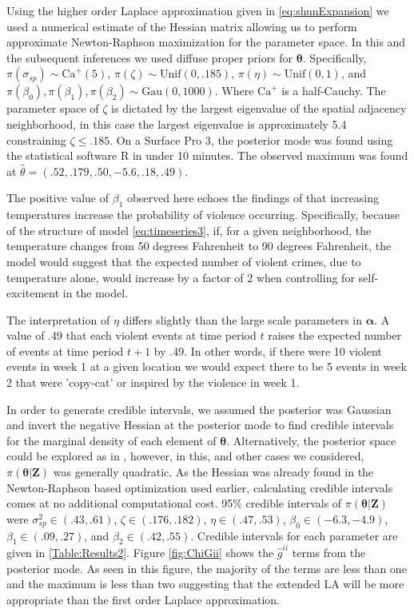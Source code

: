 \documentclass[11pt]{isuthesis}
\begin{document}
	Using the higher order Laplace approximation given in \eqref{eq:shunExpansion} we used a numerical estimate of the Hessian matrix allowing us to perform approximate Newton-Raphson maximization for the parameter space.  In this and the subsequent inferences we used diffuse proper priors for $\boldsymbol{\theta}$.  Specifically, $\pi(\sigma_{sp})\sim \text{Ca}^{+}(5)$, $\pi(\zeta) \sim \text{Unif}(0,.185)$, $\pi(\eta)\sim \text{Unif}(0,1)$, and $\pi(\beta_0),\pi(\beta_1),\pi(\beta_2) \sim \text{Gau} (0,1000)$.  Where $\text{Ca}^+$ is a half-Cauchy.  The parameter space of $\zeta$ is dictated by the largest eigenvalue of the spatial adjacency neighborhood, in this case the largest eigenvalue is approximately 5.4 constraining $\zeta \leq .185$.  On a Surface Pro 3, the posterior mode was found using the statistical software R in under 10 minutes.  The observed maximum was found at $\hat{\theta}=(.52,.179,.50,-5.6,.18,.49)$.  
	
	The positive value of $\beta_1$ observed here echoes the findings of \cite{anderson1987temperature} that increasing temperatures increase the probability of violence occurring.  Specifically, because of the structure of model \eqref{eq:timeseries3}, 
	if, for a given neighborhood, the temperature changes from 50 degrees Fahrenheit to 90 degrees Fahrenheit, the model would suggest that the expected number of violent crimes, due to temperature alone, would increase by a factor of 2 when controlling for self-excitement in the model.  
	
	The interpretation of $\eta$ differs slightly than the large scale parameters in $\boldsymbol{\alpha}$.  A value of .49 that each violent events at time period $t$ raises the expected number of events at time period $t+1$ by .49.  In other words, if there were 10 violent events in week 1 at a given location we would expect there to be 5 events in week 2 that were 'copy-cat' or inspired by the violence in week 1.
	
	In order to generate credible intervals, we assumed the posterior was Gaussian and invert the negative Hessian at the posterior mode to find credible intervals for the marginal density of each element of $\boldsymbol{\theta}$.  Alternatively, the posterior space could be explored as in \cite{rue2009approximate}, however, in this, and other cases we considered, $\pi(\boldsymbol{\theta}|\boldsymbol{Z})$ was generally quadratic.  As the Hessian was already found in the Newton-Raphson based optimization used earlier, calculating credible intervals comes at no additional computational cost. 95\% credible intervals of $\pi(\boldsymbol{\theta}|\boldsymbol{Z})$ were $\sigma_{sp}^2 \in (.43,.61)$, $\zeta \in (.176,.182)$, $\eta \in (.47,.53)$, $\beta_0 \in (-6.3,-4.9)$, $\beta_1 \in (.09,.27)$, and $\beta_2 \in (.42,.55)$.  Credible intervals for each parameter are given in \ref{Table:Results2}.  Figure \ref{fig:ChiGii} shows the $\hat{g}^{ii}$ terms from the posterior mode.  As seen in this figure, the majority of the terms are less than one and the maximum is less than two suggesting that the extended LA will be more appropriate than the first order Laplace approximation.
	
\end{document}
